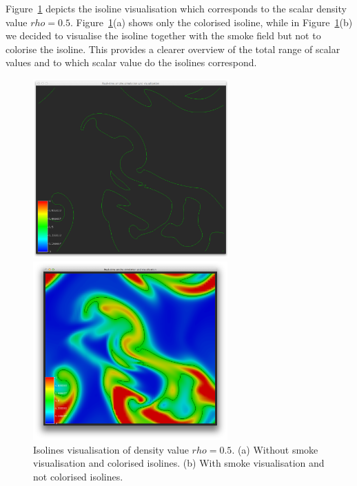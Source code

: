 Figure~\ref{fig:isoline} depicts the isoline visualisation which corresponds to the scalar density value $rho = 0.5$. Figure~\ref{fig:isoline}(a) shows only the colorised isoline, while in Figure~\ref{fig:isoline}(b) we decided to visualise the isoline together with the smoke field but not to colorise the isoline. This provides a clearer overview of the total range of scalar values and to which scalar value do the isolines correspond.

\begin{figure}[htbp]
\begin{center}
\begin{minipage}[t]{0.48\textwidth}
\includegraphics[height=2.7in]{figures/isolines/isoline.png}
\end{minipage}
\begin{minipage}[t]{0.48\textwidth}
\includegraphics[height=2.7in]{figures/isolines/isolineSmoke.png}
\end{minipage}
\caption{Isolines visualisation of density value $rho = 0.5$. (a) Without smoke visualisation and colorised isolines. (b) With smoke visualisation and not colorised isolines.}
\label{fig:isoline}
\end{center}
\end{figure}

